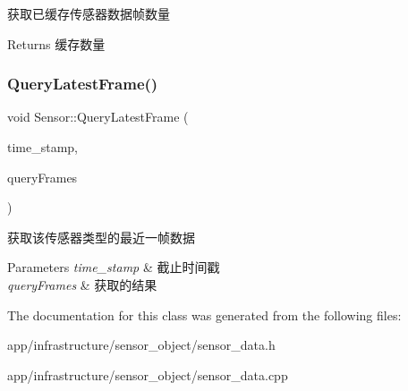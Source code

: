 获取已缓存传感器数据帧数量 

\begin{DoxyReturn}{Returns}
缓存数量 
\end{DoxyReturn}
\mbox{\label{classSensor_aacdaea428253153f3be4bc556bf2f2a8}} 
\subsubsection{\texorpdfstring{Query\+Latest\+Frame()}{QueryLatestFrame()}}
{\footnotesize\ttfamily void Sensor\+::\+Query\+Latest\+Frame (\begin{DoxyParamCaption}\item[{const uint32\+\_\+t}]{time\+\_\+stamp,  }\item[{std\+::vector$<$ Sensor\+Frame $>$ \&}]{query\+Frames }\end{DoxyParamCaption})}



获取该传感器类型的最近一帧数据 


\begin{DoxyParams}{Parameters}
{\em time\+\_\+stamp} & 截止时间戳 \\
\hline
{\em query\+Frames} & 获取的结果 \\
\hline
\end{DoxyParams}


The documentation for this class was generated from the following files\+:\begin{DoxyCompactItemize}
\item 
app/infrastructure/sensor\+\_\+object/sensor\+\_\+data.\+h\item 
app/infrastructure/sensor\+\_\+object/sensor\+\_\+data.\+cpp\end{DoxyCompactItemize}
